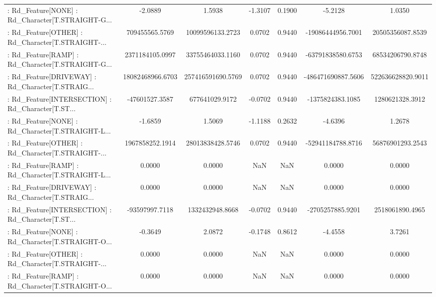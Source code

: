 \begin{longtable}{p{4cm}cccccc}
 : Rd\_Feature[NONE] : Rd\_Character[T.STRAIGHT-G... &           -2.0889 &            1.5938 & -1.3107 &       0.1900 &            -5.2128 &            1.0350 \\
 : Rd\_Feature[OTHER] : Rd\_Character[T.STRAIGHT-... &    709455565.5769 &  10099596133.2723 &  0.0702 &       0.9440 &  -19086444956.7001 &  20505356087.8539 \\
 : Rd\_Feature[RAMP] : Rd\_Character[T.STRAIGHT-G... &   2371184105.0997 &  33755464033.1160 &  0.0702 &       0.9440 &  -63791838580.6753 &  68534206790.8748 \\
 : Rd\_Feature[DRIVEWAY] : Rd\_Character[T.STRAIG... &  18082468966.6703 & 257416591690.5769 &  0.0702 &       0.9440 & -486471690887.5606 & 522636628820.9011 \\
 : Rd\_Feature[INTERSECTION] : Rd\_Character[T.ST... &    -47601527.3587 &    677641029.9172 & -0.0702 &       0.9440 &   -1375824383.1085 &   1280621328.3912 \\
 : Rd\_Feature[NONE] : Rd\_Character[T.STRAIGHT-L... &           -1.6859 &            1.5069 & -1.1188 &       0.2632 &            -4.6396 &            1.2678 \\
 : Rd\_Feature[OTHER] : Rd\_Character[T.STRAIGHT-... &   1967858252.1914 &  28013838428.5746 &  0.0702 &       0.9440 &  -52941184788.8716 &  56876901293.2543 \\
 : Rd\_Feature[RAMP] : Rd\_Character[T.STRAIGHT-L... &            0.0000 &            0.0000 &     NaN &          NaN &             0.0000 &            0.0000 \\
 : Rd\_Feature[DRIVEWAY] : Rd\_Character[T.STRAIG... &            0.0000 &            0.0000 &     NaN &          NaN &             0.0000 &            0.0000 \\
 : Rd\_Feature[INTERSECTION] : Rd\_Character[T.ST... &    -93597997.7118 &   1332432948.8668 & -0.0702 &       0.9440 &   -2705257885.9201 &   2518061890.4965 \\
 : Rd\_Feature[NONE] : Rd\_Character[T.STRAIGHT-O... &           -0.3649 &            2.0872 & -0.1748 &       0.8612 &            -4.4558 &            3.7261 \\
 : Rd\_Feature[OTHER] : Rd\_Character[T.STRAIGHT-... &            0.0000 &            0.0000 &     NaN &          NaN &             0.0000 &            0.0000 \\
 : Rd\_Feature[RAMP] : Rd\_Character[T.STRAIGHT-O... &            0.0000 &            0.0000 &     NaN &          NaN &             0.0000 &            0.0000 \\
\end{longtable}
